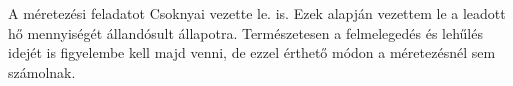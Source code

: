 \begin{formal}
A méretezési feladatot Csoknyai vezette le. \cite[359.~o.]{Herz} is. Ezek alapján vezettem le a leadott hő mennyiségét állandósult állapotra. Természetesen a felmelegedés és lehűlés idejét is figyelembe kell majd venni, de ezzel érthető módon a méretezésnél sem számolnak.

\end{formal}



